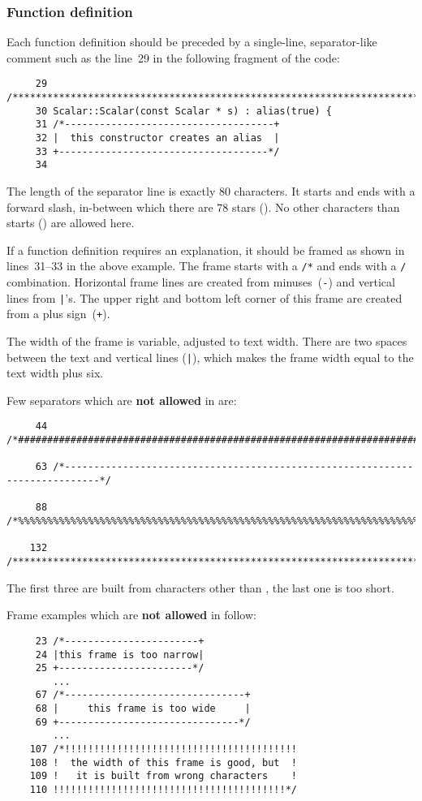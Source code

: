 \subsubsection{Function definition}

Each function definition should be preceded by a single-line, separator-like
comment such as the line~29 in the following fragment of the code:
%
{\small \begin{verbatim}
     29 /******************************************************************************/
     30 Scalar::Scalar(const Scalar * s) : alias(true) {
     31 /*------------------------------------+
     32 |  this constructor creates an alias  |
     33 +------------------------------------*/
     34 
\end{verbatim}}
% 
The length of the separator line is exactly 80 characters. It starts and ends 
with a forward slash, in-between which there are 78 stars ({\tt *}). 
No other characters than starts ({\tt *}) are allowed here.

If a function definition requires an explanation, it should be framed as shown
in lines~31--33 in the above example. The frame starts with a {\tt /*} and ends
 with a {\tt */} combination. Horizontal frame lines are created from 
minuses~({\tt -}) and vertical lines from {\tt |}'s. The upper right and bottom 
left corner of this frame are created from a plus sign~({\tt +}). 

The width of the frame is variable, adjusted to text width. There are two spaces
between the text and vertical lines ({\tt |}), which makes the frame width
equal to the text width plus six. 

Few separators which are {\bf not allowed} in {\psiboil} are:
%
{\small \begin{verbatim}
     44 /*############################################################################*/
         
     63 /*----------------------------------------------------------------------------*/
        
     88 /*%%%%%%%%%%%%%%%%%%%%%%%%%%%%%%%%%%%%%%%%%%%%%%%%%%%%%%%%%%%%%%%%%%%%%%%%%%%%*/
        
    132 /****************************************************************************/
\end{verbatim}}
% 
The  first three are built from characters other than {\tt *}, the last one is too
short.

Frame examples which are {\bf not allowed} in {\psiboil} follow:
%
{\small \begin{verbatim}
     23 /*-----------------------+
     24 |this frame is too narrow|
     25 +-----------------------*/
        ...
     67 /*-------------------------------+
     68 |     this frame is too wide     |
     69 +-------------------------------*/
        ...
    107 /*!!!!!!!!!!!!!!!!!!!!!!!!!!!!!!!!!!!!!!!!
    108 !  the width of this frame is good, but  !
    109 !   it is built from wrong characters    !
    110 !!!!!!!!!!!!!!!!!!!!!!!!!!!!!!!!!!!!!!!!*/
\end{verbatim}}
% 

